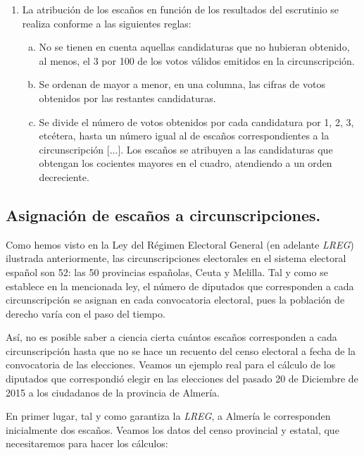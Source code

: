 \documentclass[11pt]{article}
\begin{document}
{\begin{leftbar}
		\begin{enumerate}
			\item La atribución de los escaños en función de los resultados del escrutinio se realiza conforme a las siguientes reglas:
			\begin{enumerate}[a)]
					\item No se tienen en cuenta aquellas candidaturas que no hubieran obtenido, al menos, el 3 por 100 de los votos válidos emitidos en la circunscripción.
					\item Se ordenan de mayor a menor, en una columna, las cifras de votos obtenidos por las restantes candidaturas.
					\item Se divide el número de votos obtenidos por cada candidatura por 1, 2, 3, etcétera, hasta un número igual al de escaños correspondientes a la circunscripción [...]. Los escaños se atribuyen a las candidaturas que obtengan los cocientes mayores en el cuadro, atendiendo a un orden decreciente.
				\end{enumerate}
		\end{enumerate}

	\end{leftbar}
	}
	
	\subsection	{Asignación de escaños a circunscripciones.}
	
	Como hemos visto en la Ley del Régimen Electoral General (en adelante \textit{LREG}) ilustrada anteriormente, las circunscripciones electorales en el sistema electoral español son 52: las 50 provincias españolas, Ceuta y Melilla. Tal y como se establece en la mencionada ley, el número de diputados que corresponden a cada circunscripción se asignan en cada convocatoria electoral, pues la población de derecho varía con el paso del tiempo.
	
	Así, no es posible saber a ciencia cierta cuántos escaños corresponden a cada circunscripción hasta que no se hace un recuento del censo electoral a fecha de la convocatoria de las elecciones. Veamos un ejemplo real para el cálculo de los diputados que correspondió elegir en las elecciones del pasado 20 de Diciembre de 2015 a los ciudadanos de la provincia de Almería.
	
	En primer lugar, tal y como garantiza la \textit{LREG}, a Almería le corresponden inicialmente dos escaños. Veamos los datos del censo provincial y estatal, que necesitaremos para hacer los cálculos:
	
\end{document}
